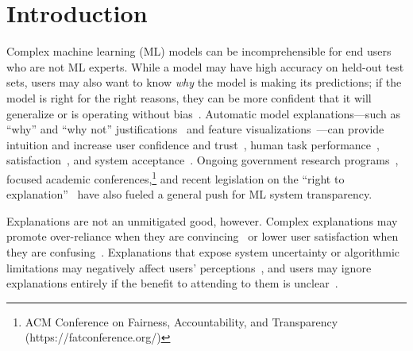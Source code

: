 \section{Introduction}
Complex machine learning (ML) models can be incomprehensible for end users who are not ML experts. While a model may have high accuracy on held-out test sets, users may also want to know {\em why} the model is making its predictions; if the model is right for the right reasons, they can be more confident that it will generalize or is operating without bias~\cite{Dodge2019ExplainingJudgment}. Automatic model explanations---such as ``why'' and ``why not'' justifications~\cite{Lim2009WhySystems} and feature visualizations~\cite{Kulesza2015PrinciplesLearning}---can provide intuition and increase user confidence and trust~\cite{Pu2006TrustInterfaces, Bunt2007UnderstandingCustomization}, human task performance~\cite{Stowers2017InsightsUncertainty, Feng2019WhatPlay,schmidt-aaai19},  satisfaction~\cite{Biran2017Human-centricPredictions}, and system acceptance~\cite{Herlocker2000ExplainingRecommendations}. Ongoing government research programs~\cite{Gunning2016ExplainableXAI}, focused academic conferences,\footnote{ACM Conference on Fairness, Accountability, and Transparency (https://fatconference.org/)} and recent legislation on the ``right to explanation''~\cite{Goodman2017EuropeanExplanation} have also fueled a general push for ML system transparency. 

Explanations are not an unmitigated good, however. Complex explanations may promote over-reliance when they are convincing~\cite{Stumpf2016ExplanationsSystems} or lower user satisfaction when they are confusing~\cite{Narayanan2018HowExplanation}. Explanations that expose system uncertainty or algorithmic limitations may negatively affect users' perceptions~\cite{Lim2011InvestigatingApplications, Stowers2017InsightsUncertainty, Cai2019TheInterface}, and users may ignore explanations entirely if the benefit to attending to them is unclear~\cite{Kulesza2013TooModels}. 

